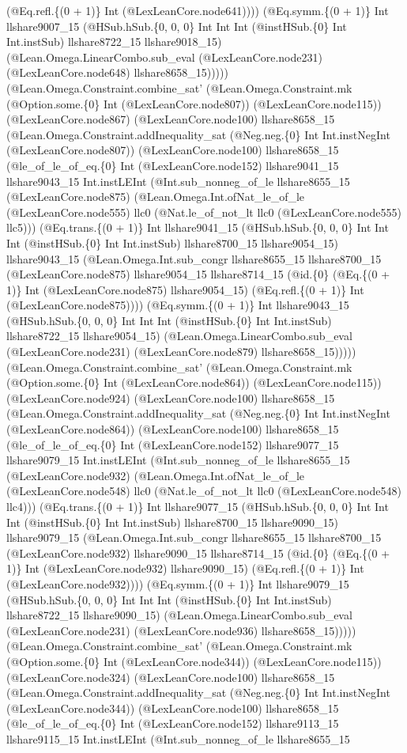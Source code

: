 \documentclass[11pt]{article}
\begin{document}
(@Eq.refl.\{(0 + 1)\} Int (@LexLeanCore.node641)))) (@Eq.symm.\{(0 + 1)\} Int llshare9007\_15 (@HSub.hSub.\{0, 0, 0\} Int Int Int (@instHSub.\{0\} Int Int.instSub) llshare8722\_15 llshare9018\_15) (@Lean.Omega.LinearCombo.sub\_eval (@LexLeanCore.node231) (@LexLeanCore.node648) llshare8658\_15))))) (@Lean.Omega.Constraint.combine\_sat' (@Lean.Omega.Constraint.mk (@Option.some.\{0\} Int (@LexLeanCore.node807)) (@LexLeanCore.node115)) (@LexLeanCore.node867) (@LexLeanCore.node100) llshare8658\_15 (@Lean.Omega.Constraint.addInequality\_sat (@Neg.neg.\{0\} Int Int.instNegInt (@LexLeanCore.node807)) (@LexLeanCore.node100) llshare8658\_15 (@le\_of\_le\_of\_eq.\{0\} Int (@LexLeanCore.node152) llshare9041\_15 llshare9043\_15 Int.instLEInt (@Int.sub\_nonneg\_of\_le llshare8655\_15 (@LexLeanCore.node875) (@Lean.Omega.Int.ofNat\_le\_of\_le (@LexLeanCore.node555) llc0 (@Nat.le\_of\_not\_lt llc0 (@LexLeanCore.node555) llc5))) (@Eq.trans.\{(0 + 1)\} Int llshare9041\_15 (@HSub.hSub.\{0, 0, 0\} Int Int Int (@instHSub.\{0\} Int Int.instSub) llshare8700\_15 llshare9054\_15) llshare9043\_15 (@Lean.Omega.Int.sub\_congr llshare8655\_15 llshare8700\_15 (@LexLeanCore.node875) llshare9054\_15 llshare8714\_15 (@id.\{0\} (@Eq.\{(0 + 1)\} Int (@LexLeanCore.node875) llshare9054\_15) (@Eq.refl.\{(0 + 1)\} Int (@LexLeanCore.node875)))) (@Eq.symm.\{(0 + 1)\} Int llshare9043\_15 (@HSub.hSub.\{0, 0, 0\} Int Int Int (@instHSub.\{0\} Int Int.instSub) llshare8722\_15 llshare9054\_15) (@Lean.Omega.LinearCombo.sub\_eval (@LexLeanCore.node231) (@LexLeanCore.node879) llshare8658\_15))))) (@Lean.Omega.Constraint.combine\_sat' (@Lean.Omega.Constraint.mk (@Option.some.\{0\} Int (@LexLeanCore.node864)) (@LexLeanCore.node115)) (@LexLeanCore.node924) (@LexLeanCore.node100) llshare8658\_15 (@Lean.Omega.Constraint.addInequality\_sat (@Neg.neg.\{0\} Int Int.instNegInt (@LexLeanCore.node864)) (@LexLeanCore.node100) llshare8658\_15 (@le\_of\_le\_of\_eq.\{0\} Int (@LexLeanCore.node152) llshare9077\_15 llshare9079\_15 Int.instLEInt (@Int.sub\_nonneg\_of\_le llshare8655\_15 (@LexLeanCore.node932) (@Lean.Omega.Int.ofNat\_le\_of\_le (@LexLeanCore.node548) llc0 (@Nat.le\_of\_not\_lt llc0 (@LexLeanCore.node548) llc4))) (@Eq.trans.\{(0 + 1)\} Int llshare9077\_15 (@HSub.hSub.\{0, 0, 0\} Int Int Int (@instHSub.\{0\} Int Int.instSub) llshare8700\_15 llshare9090\_15) llshare9079\_15 (@Lean.Omega.Int.sub\_congr llshare8655\_15 llshare8700\_15 (@LexLeanCore.node932) llshare9090\_15 llshare8714\_15 (@id.\{0\} (@Eq.\{(0 + 1)\} Int (@LexLeanCore.node932) llshare9090\_15) (@Eq.refl.\{(0 + 1)\} Int (@LexLeanCore.node932)))) (@Eq.symm.\{(0 + 1)\} Int llshare9079\_15 (@HSub.hSub.\{0, 0, 0\} Int Int Int (@instHSub.\{0\} Int Int.instSub) llshare8722\_15 llshare9090\_15) (@Lean.Omega.LinearCombo.sub\_eval (@LexLeanCore.node231) (@LexLeanCore.node936) llshare8658\_15))))) (@Lean.Omega.Constraint.combine\_sat' (@Lean.Omega.Constraint.mk (@Option.some.\{0\} Int (@LexLeanCore.node344)) (@LexLeanCore.node115)) (@LexLeanCore.node324) (@LexLeanCore.node100) llshare8658\_15 (@Lean.Omega.Constraint.addInequality\_sat (@Neg.neg.\{0\} Int Int.instNegInt (@LexLeanCore.node344)) (@LexLeanCore.node100) llshare8658\_15 (@le\_of\_le\_of\_eq.\{0\} Int (@LexLeanCore.node152) llshare9113\_15 llshare9115\_15 Int.instLEInt (@Int.sub\_nonneg\_of\_le llshare8655\_15 
\end{document}
